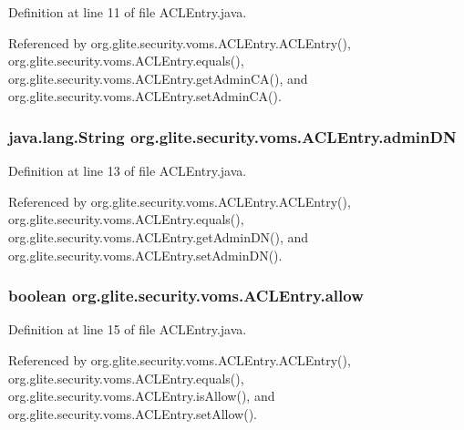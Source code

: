 Definition at line 11 of file ACLEntry.java.



Referenced by org.glite.security.voms.ACLEntry.ACLEntry(), org.glite.security.voms.ACLEntry.equals(), org.glite.security.voms.ACLEntry.getAdminCA(), and org.glite.security.voms.ACLEntry.setAdminCA().

\hypertarget{classorg_1_1glite_1_1security_1_1voms_1_1ACLEntry_a9addfee20d8b6819f2f356c71e33babb}{
\subsubsection[{adminDN}]{\setlength{\rightskip}{0pt plus 5cm}java.lang.String {\bf org.glite.security.voms.ACLEntry.adminDN}}}
\label{classorg_1_1glite_1_1security_1_1voms_1_1ACLEntry_a9addfee20d8b6819f2f356c71e33babb}


Definition at line 13 of file ACLEntry.java.



Referenced by org.glite.security.voms.ACLEntry.ACLEntry(), org.glite.security.voms.ACLEntry.equals(), org.glite.security.voms.ACLEntry.getAdminDN(), and org.glite.security.voms.ACLEntry.setAdminDN().

\hypertarget{classorg_1_1glite_1_1security_1_1voms_1_1ACLEntry_a9027e97cddd9c2358783a1ce1df00979}{
\subsubsection[{allow}]{\setlength{\rightskip}{0pt plus 5cm}boolean {\bf org.glite.security.voms.ACLEntry.allow}}}
\label{classorg_1_1glite_1_1security_1_1voms_1_1ACLEntry_a9027e97cddd9c2358783a1ce1df00979}


Definition at line 15 of file ACLEntry.java.



Referenced by org.glite.security.voms.ACLEntry.ACLEntry(), org.glite.security.voms.ACLEntry.equals(), org.glite.security.voms.ACLEntry.isAllow(), and org.glite.security.voms.ACLEntry.setAllow().

